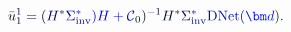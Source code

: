 \documentclass[12pt]{article}
\begin{document}
\makeatletter
\renewcommand*{\@textcolor}[3]{%
  \protect\leavevmode
  \begingroup
    \color#1{#2}#3%
  \endgroup
}
\makeatother
\begin{displaymath}
{\mathcolor[RGB]{0,0,15}{\bar { \mathcolor[RGB]{0,0,30}{u} } }} _ { \mathcolor[RGB]{0,0,45}{1} } ^ { \mathcolor[RGB]{0,0,60}{1} } \mathcolor[RGB]{0,0,75}{=} \mathcolor[RGB]{0,0,90}{(} \mathcolor[RGB]{0,0,105}{H} ^ { \mathcolor[RGB]{0,0,120}{*} } \mathcolor[RGB]{0,0,135}{\Sigma} _ { \mathrm { \mathcolor[RGB]{0,0,150}{i} \mathcolor[RGB]{0,0,165}{n} \mathcolor[RGB]{0,0,180}{v} } } ^ { \mathcolor[RGB]{0,0,195}{*} } \mathcolor[RGB]{0,0,210}{)} \mathcolor[RGB]{0,0,225}{H} \mathcolor[RGB]{0,0,240}{+} \mathcal { \mathcolor[RGB]{0,0,255}{C} } _ { \mathcolor[RGB]{0,15,0}{0} } \mathcolor[RGB]{0,15,15}{)} ^ { \mathcolor[RGB]{0,15,30}{-} \mathcolor[RGB]{0,15,45}{1} } \mathcolor[RGB]{0,15,60}{H} ^ { \mathcolor[RGB]{0,15,75}{*} } \mathcolor[RGB]{0,15,90}{\Sigma} _ { \mathrm { \mathcolor[RGB]{0,15,105}{i} \mathcolor[RGB]{0,15,120}{n} \mathcolor[RGB]{0,15,135}{v} } } ^ { \mathcolor[RGB]{0,15,150}{*} } \mathrm { \mathcolor[RGB]{0,15,165}{D} \mathcolor[RGB]{0,15,180}{N} \mathcolor[RGB]{0,15,195}{e} \mathcolor[RGB]{0,15,210}{t} } \mathcolor[RGB]{0,15,225}{(} \mathcolor[RGB]{0,15,240}{\bm} { \mathcolor[RGB]{0,15,255}{d} } \mathcolor[RGB]{0,30,0}{)} \mathcolor[RGB]{0,30,15}{.}
\end{displaymath}
\end{document}
